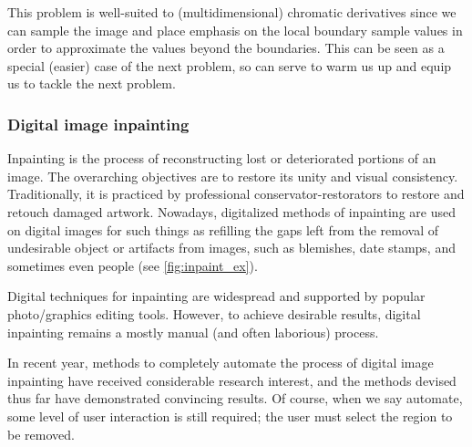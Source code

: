 \documentclass[11pt,oneside]{book}
\theoremstyle{plain}
\theoremstyle{definition}
\theoremstyle{remark}
\begin{document}
This problem is well-suited to (multidimensional) chromatic derivatives since we
can sample the image and place emphasis on the local boundary sample 
values in order to approximate the values beyond the boundaries. This can be seen as a
special (easier) case of the next problem, so can serve to warm us up and equip
us to tackle the next problem.

\subsubsection{Digital image inpainting}

Inpainting is the process of reconstructing lost or deteriorated portions of an 
image. The overarching objectives are to restore its unity and visual consistency. 
Traditionally, it is practiced by professional conservator-restorators to restore 
and retouch damaged artwork. Nowadays, digitalized methods of inpainting are used on 
digital images for such things as refilling the gaps left from the removal of undesirable
object or artifacts from images, such as blemishes, date stamps, and sometimes even people (see \cref{fig:inpaint_ex}).

Digital techniques for inpainting are widespread and supported by popular photo/graphics 
editing tools. However, to achieve desirable results, digital inpainting remains a mostly manual (and often laborious) process.  

In recent year, methods to completely automate the process of digital image inpainting 
have received considerable research interest, and the methods devised thus
far have demonstrated convincing results. Of course, when we say automate, some level of
user interaction is still required; the user must select the region to be removed. 
\end{document}
